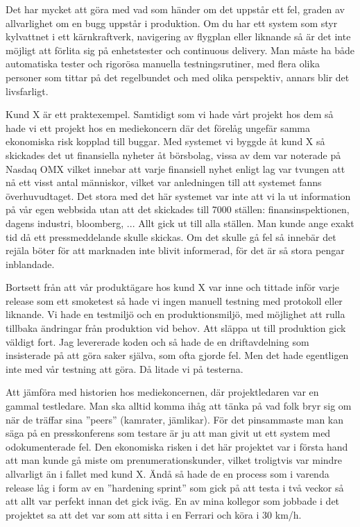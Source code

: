 \documentclass[11pt]{article}
\begin{document}
Det har mycket att göra med vad som händer om det uppstår ett fel, graden av allvarlighet om en bugg uppstår i produktion. Om du har ett system som styr kylvattnet i ett kärnkraftverk, navigering av flygplan eller liknande så är det inte möjligt att förlita sig på enhetstester och continuous delivery. Man måste ha både automatiska tester och rigorösa manuella testningsrutiner, med flera olika personer som tittar på det regelbundet och med olika perspektiv, annars blir det livsfarligt.

Kund X är ett praktexempel. Samtidigt som vi hade vårt projekt hos dem så hade vi ett projekt hos en mediekoncern där det förelåg ungefär samma ekonomiska risk kopplad till buggar. Med systemet vi byggde åt kund X så skickades det ut finansiella nyheter åt börsbolag, vissa av dem var noterade på Nasdaq OMX vilket innebar att varje finansiell nyhet enligt lag var tvungen att nå ett visst antal människor, vilket var anledningen till att systemet fanns överhuvudtaget. Det stora med det här systemet var inte att vi la ut information på vår egen webbsida utan att det skickades till 7000 ställen: finansinspektionen, dagens industri, bloomberg, ... Allt gick ut till alla ställen. Man kunde ange exakt tid då ett pressmeddelande skulle skickas. Om det skulle gå fel så innebär det rejäla böter för att marknaden inte blivit informerad, för det är så stora pengar inblandade.

Bortsett från att vår produktägare hos kund X var inne och tittade inför varje release som ett smoketest så hade vi ingen manuell testning med protokoll eller liknande. Vi hade en testmiljö och en produktionsmiljö, med möjlighet att rulla tillbaka ändringar från produktion vid behov. Att släppa ut till produktion gick väldigt fort. Jag levererade koden och så hade de en driftavdelning som insisterade på att göra saker själva, som ofta gjorde fel. Men det hade egentligen inte med vår testning att göra. Då litade vi på testerna.

Att jämföra med historien hos mediekoncernen, där projektledaren var en gammal testledare. Man ska alltid komma ihåg att tänka på vad folk bryr sig om när de träffar sina ”peers” (kamrater, jämlikar). För det pinsammaste man kan säga på en presskonferens som testare är ju att man givit ut ett system med odokumenterade fel. Den ekonomiska risken i det här projektet var i första hand att man kunde gå miste om prenumerationskunder, vilket troligtvis var mindre allvarligt än i fallet med kund X. Ändå så hade de en process som i varenda release låg i form av en ”hardening sprint” som gick på att testa i två veckor så att allt var perfekt innan det gick iväg. En av mina kollegor som jobbade i det projektet sa att det var som att sitta i en Ferrari och köra i 30 km/h.
\end{document}
